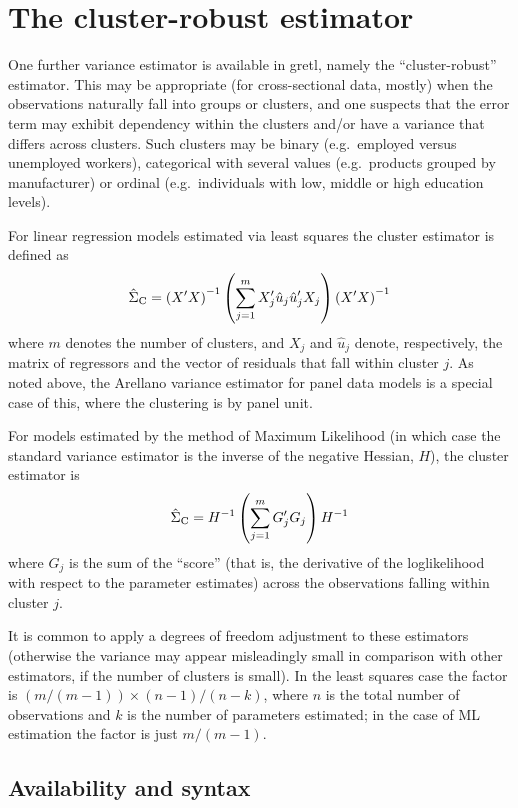 \section{The cluster-robust estimator}
\label{sec:vcv-cluster}

One further variance estimator is available in gretl, namely the
``cluster-robust'' estimator. This may be appropriate (for
cross-sectional data, mostly) when the observations naturally fall
into groups or clusters, and one suspects that the error term may
exhibit dependency within the clusters and/or have a variance that
differs across clusters. Such clusters may be binary (e.g.\ employed
versus unemployed workers), categorical with several values (e.g.\
products grouped by manufacturer) or ordinal (e.g.\ individuals with
low, middle or high education levels). 

For linear regression models estimated via least squares the cluster
estimator is defined as
\[
\hat{\Sigma}_{\rm C} = \left(X'X\right)^{-1} 
  \left(\sum_{j=1}^m X_j'\hat{u}_j \hat{u}_j' X_j\right)
  \left(X'X\right)^{-1}
\]
where $m$ denotes the number of clusters, and $X_j$ and $\hat{u}_j$
denote, respectively, the matrix of regressors and the vector of
residuals that fall within cluster $j$. As noted above, the Arellano
variance estimator for panel data models is a special case of this,
where the clustering is by panel unit.

For models estimated by the method of Maximum Likelihood (in which
case the standard variance estimator is the inverse of the negative
Hessian, $H$), the cluster estimator is
\[
\hat{\Sigma}_{\rm C} = H^{-1} \left(\sum_{j=1}^m G_j' G_j\right)
  H^{-1}
\]
where $G_j$ is the sum of the ``score'' (that is, the derivative of
the loglikelihood with respect to the parameter estimates) across the
observations falling within cluster $j$.

It is common to apply a degrees of freedom adjustment to these
estimators (otherwise the variance may appear misleadingly small in
comparison with other estimators, if the number of clusters is small).
In the least squares case the factor is $(m/(m-1)) \times
(n-1)/(n-k)$, where $n$ is the total number of observations and $k$ is
the number of parameters estimated; in the case of ML estimation the
factor is just $m/(m-1)$.

\subsection{Availability and syntax}

